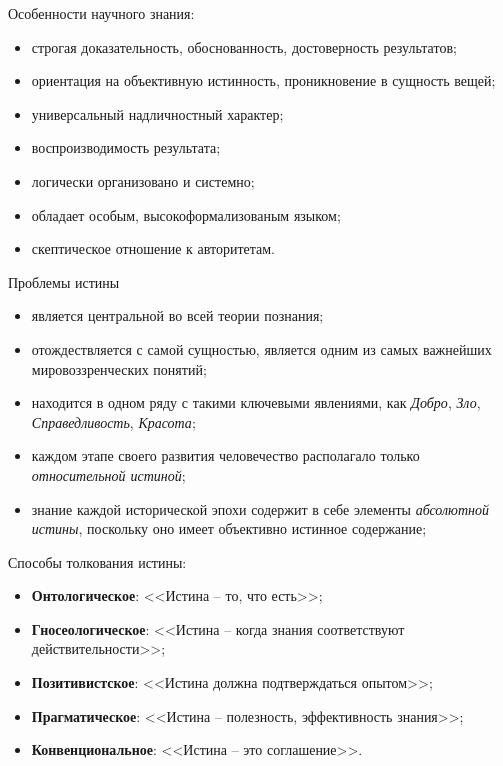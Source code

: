 Особенности научного знания:
\begin{itemize}
    \item строгая доказательность, обоснованность, достоверность результатов;
    \item ориентация на объективную истинность, проникновение в сущность вещей;
    \item универсальный надличностный характер;
    \item воспроизводимость результата;
    \item логически организовано и системно;
    \item обладает особым, высокоформализованым языком;
    \item скептическое отношение к авторитетам.
\end{itemize}

Проблемы истины
\begin{itemize}
    \item является центральной во всей теории познания;
    \item отождествляется с самой сущностью, является одним из самых важнейших мировоззренческих понятий;
    \item находится в одном ряду с такими ключевыми явлениями, как \emph{Добро}, \emph{Зло}, 
        \emph{Справедливость}, \emph{Красота};
    \item каждом этапе своего развития человечество располагало только \emph{относительной истиной};
    \item знание каждой исторической эпохи содержит в себе элементы \emph{абсолютной истины}, поскольку оно 
        имеет объективно истинное содержание;
\end{itemize}

Способы толкования истины:
\begin{itemize}
    \item \textbf{Онтологическое}: <<Истина -- то, что есть>>;
    \item \textbf{Гносеологическое}: <<Истина -- когда знания соответствуют действительности>>;
    \item \textbf{Позитивистское}: <<Истина должна подтверждаться опытом>>;
    \item \textbf{Прагматическое}: <<Истина -- полезность, эффективность знания>>;
    \item \textbf{Конвенциональное}: <<Истина -- это соглашение>>.
\end{itemize}


